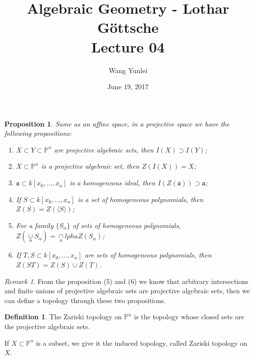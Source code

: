 \documentclass{amsart}
\theoremstyle{plain}
\newtheorem{proposition}{Proposition}
\theoremstyle{definition}
\newtheorem{definition}{Definition}
\theoremstyle{remark}
\newtheorem*{remark}{Remark}
\numberwithin{equation}{section}
\begin{document}
\title[Complete-simple distributive lattices]
{Algebraic Geometry - Lothar G\"{o}ttsche \\
	Lecture 04}
\author{Wang Yunlei}
\date{June 19, 2017}
 
\maketitle


\begin{proposition}
	Same as an affine space, in a projective space we have the following propositions:
	\begin{enumerate}
		\item $ X\subset Y\subset \mathbb{P}^n $ are projective algebraic sets, then
		$ I(X)\supset I(Y) $;
		\item $ X\subset \mathbb{P}^n $ is a projective algebraic set, then $ Z(I(X))=X $;
		\item $ \mathfrak{a}\subset k[x_0,\dots,x_n] $ is a homogeneous ideal, then $ I(Z(\mathfrak{a}))\supset \mathfrak{a} $;
		\item If $ S\subset k[x_0,\dots,x_n] $ is a set of homogeneous polynomials, then $ Z(S)=Z(\langle S \rangle ) $;
		\item For a family $ \{ S_\alpha \} $ of sets of homogeneous polynomials, $ Z(\mathop{\cup}\limits_\alpha S_\alpha) = \mathop{\cap}\limits_alpha Z(S_\alpha)$;
		\item If $ T,S\subset k[x_0,\dots,x_n] $ are sets of homogeneous polynomials, then $ Z(ST)=Z(S)\cup Z(T) $.
	\end{enumerate}
\end{proposition}
\begin{remark}
	From the proposition (5) and (6) we know that arbitrary intersections and finite unions  of projective algebraic sets are projective algebraic sets, then we can define a topology through these two propositions.
\end{remark}
\begin{definition}
	The Zariski topology on $ \mathbb{P}^n $ is the topology whose closed sets are the projective algebraic sets.
	
	If $ X\subset \mathbb{P}^n $ is a subset, we give it the induced topology, called Zariski topology on $ X $.
\end{definition}
\end{document}
